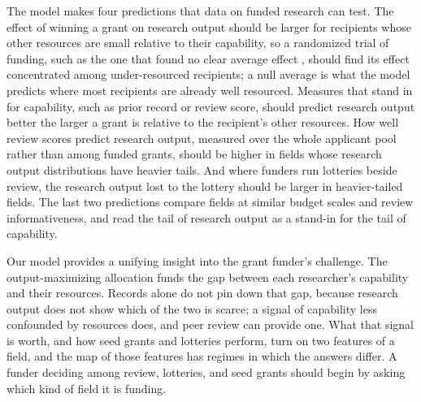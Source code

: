 \documentclass[9pt,twocolumn,twoside]{pnas-new}
\begin{document}
The model makes four predictions that data on funded research can test. The effect of winning a grant on research output should be larger for recipients whose other resources are small relative to their capability, so a randomized trial of funding, such as the one that found no clear average effect \citep{Barnett2024}, should find its effect concentrated among under-resourced recipients; a null average is what the model predicts where most recipients are already well resourced. Measures that stand in for capability, such as prior record or review score, should predict research output better the larger a grant is relative to the recipient's other resources. How well review scores predict research output, measured over the whole applicant pool rather than among funded grants, should be higher in fields whose research output distributions have heavier tails. And where funders run lotteries beside review, the research output lost to the lottery should be larger in heavier-tailed fields. The last two predictions compare fields at similar budget scales and review informativeness, and read the tail of research output as a stand-in for the tail of capability.

Our model provides a unifying insight into the grant funder's challenge. The output-maximizing allocation funds the gap between each researcher's capability and their resources. Records alone do not pin down that gap, because research output does not show which of the two is scarce; a signal of capability less confounded by resources does, and peer review can provide one. What that signal is worth, and how seed grants and lotteries perform, turn on two features of a field, and the map of those features has regimes in which the answers differ. A funder deciding among review, lotteries, and seed grants should begin by asking which kind of field it is funding.
\end{document}
